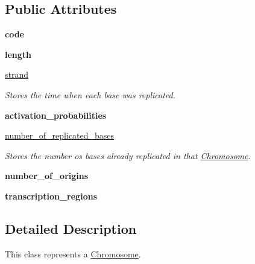 \subsection*{Public Attributes}
\begin{DoxyCompactItemize}
\item 
\mbox{\label{classsrc_1_1chromosome_1_1Chromosome_ac4b2d2d0caad93b52fb76f65cc424663}} 
{\bfseries code}
\item 
\mbox{\label{classsrc_1_1chromosome_1_1Chromosome_a368effa6f0bf8bd76593b5e14adf8c1c}} 
{\bfseries length}
\item 
\mbox{\hyperlink{classsrc_1_1chromosome_1_1Chromosome_a0a465339e3b71993e96bd29898511028}{strand}}
\begin{DoxyCompactList}\small\item\em Stores the time when each base was replicated. \end{DoxyCompactList}\item 
\mbox{\label{classsrc_1_1chromosome_1_1Chromosome_ac9c71115a4d4a73febed9d3cf432bbc6}} 
{\bfseries activation\+\_\+probabilities}
\item 
\mbox{\hyperlink{classsrc_1_1chromosome_1_1Chromosome_a10a051b6b89395ffd4eafed6e19d35b8}{number\+\_\+of\+\_\+replicated\+\_\+bases}}
\begin{DoxyCompactList}\small\item\em Stores the number os bases already replicated in that \mbox{\hyperlink{classsrc_1_1chromosome_1_1Chromosome}{Chromosome}}. \end{DoxyCompactList}\item 
\mbox{\label{classsrc_1_1chromosome_1_1Chromosome_ad8db71aebe26d3e87a717281b35f9856}} 
{\bfseries number\+\_\+of\+\_\+origins}
\item 
\mbox{\label{classsrc_1_1chromosome_1_1Chromosome_ad959c1bf71f9a5d7853b898872445a9a}} 
{\bfseries transcription\+\_\+regions}
\end{DoxyCompactItemize}


\subsection{Detailed Description}
This class represents a \mbox{\hyperlink{classsrc_1_1chromosome_1_1Chromosome}{Chromosome}}. 

